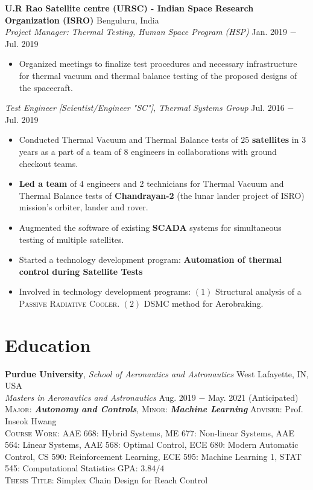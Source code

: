 \documentclass[letterpaper,10pt]{article}
\begin{document}
\vspace{5pt}
\noindent \textbf{U.R Rao Satellite centre (URSC) - Indian Space Research Organization (ISRO)} \hfill Benguluru, India \\
\textit{Project Manager: Thermal Testing, Human Space Program (HSP)} \hfill Jan. 2019 $-$ Jul. 2019
\begin{itemize}[noitemsep,nolistsep,leftmargin=0.25in,label={--}]
    \item Organized meetings to finalize test procedures and necessary infrastructure for thermal vacuum and thermal balance testing of the proposed designs of the spacecraft.
\end{itemize}

\vspace{3pt}
\textit{Test Engineer [Scientist/Engineer "SC"], Thermal Systems Group} \hfill Jul. 2016 $-$ Jul. 2019
\begin{itemize}[noitemsep,nolistsep,leftmargin=0.25in,label={--}]
    \item Conducted Thermal Vacuum and Thermal Balance tests of $25$ \textbf{satellites} in 3 years as a part of a team of 8 engineers in collaborations with ground checkout teams.
	\item \textbf{Led a team} of 4 engineers and 2 technicians for Thermal Vacuum and Thermal Balance tests of \textbf{Chandrayan-2} (the lunar lander project of ISRO) mission's orbiter, lander and rover. 
    \item Augmented the software of existing \textbf{SCADA} systems for simultaneous testing of multiple satellites.  
	\item Started a technology development program: \textbf{Automation of thermal control during Satellite Tests}
	\item Involved in technology development programs: $(1)$ Structural analysis of a \textsc{Passive Radiative Cooler}. $(2)$ DSMC method for Aerobraking.
\end{itemize}



\section{Education}
\noindent \textbf{Purdue University}, \textit{School of Aeronautics and Astronautics} \hfill West Lafayette, IN, USA \\
\textit{Masters in Aeronautics and Astronautics} \hfill Aug. 2019 $-$ May. 2021 (Anticipated)\\
\textsc{Major}: \textit{\textbf{Autonomy and Controls}}, \textsc{Minor}: \textit{\textbf{Machine Learning}} \hfill \textsc{Adviser}: Prof. Inseok Hwang\\
\textsc{Course Work}: AAE 668: Hybrid Systems, ME 677: Non-linear Systems, AAE 564: Linear Systems,  AAE 568: Optimal Control, ECE 680: Modern Automatic Control, CS 590: Reinforcement Learning, ECE 595: Machine Learning 1, STAT 545: Computational Statistics
\hfill \textsc{GPA}: $3.84/4$\\
\textsc{Thesis Title}: Simplex Chain Design for Reach Control \\
\end{document}
